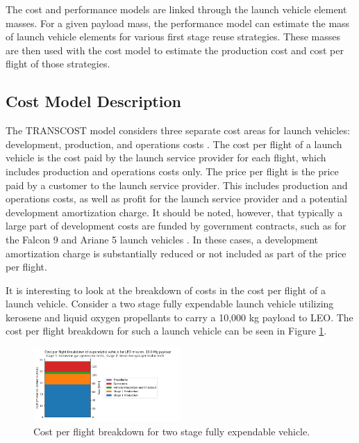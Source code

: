 \documentclass[conf]{new-aiaa}
\begin{document}
\begin{multicols}{2}
The cost and performance models are linked through the launch vehicle element masses. For a given payload mass, the performance model can estimate the mass of launch vehicle elements for various first stage reuse strategies. These masses are then used with the cost model to estimate the production cost and cost per flight of those strategies. 

\subsection{Cost Model Description}

The TRANSCOST model considers three separate cost areas for launch vehicles: development, production, and operations costs \cite{transcost}. The cost per flight of a launch vehicle is the cost paid by the launch service provider for each flight, which includes production and operations costs only. The price per flight is the price paid by a customer to the launch service provider. This includes production and operations costs, as well as profit for the launch service provider and a potential development amortization charge. It should be noted, however, that typically a large part of development costs are funded by government contracts, such as for the Falcon 9 and Ariane 5 launch vehicles \cite{NASAspaceX, ESAAriane5}. In these cases, a development amortization charge is substantially reduced or not included as part of the price per flight.

It is interesting to look at the breakdown of costs in the cost per flight of a launch vehicle. Consider a two stage fully expendable launch vehicle utilizing kerosene and liquid oxygen propellants to carry a 10,000 kg payload to LEO. The cost per flight breakdown for such a launch vehicle can be seen in Figure \ref{fig:expendable_cost_breakdown}. 

\begin{figure}[H]
    \centering
    \includegraphics[width=0.5\textwidth]{../../lvreuse/analysis/combined/plots/expendable_cost_breakdown}
    \caption{\label{fig:expendable_cost_breakdown} Cost per flight breakdown for two stage fully expendable vehicle.}
\end{figure}


\end{multicols}
\end{document}
